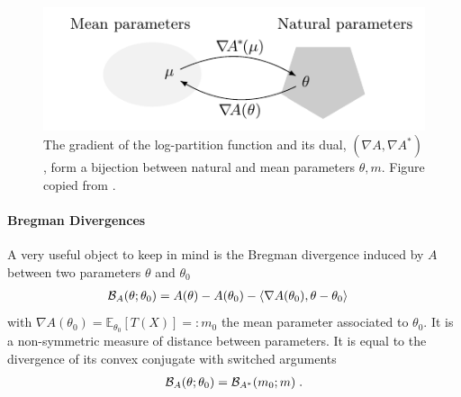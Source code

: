 \documentclass[twoside]{article}
\newcommand*{\expect}[2][]{\ensuremath{\mathbb{E}_{#1} \left[ #2 \right] }} %
\newcommand{\logpart}{A}
\newcommand{\conj}{\logpart^*}
\newcommand{\bregman}{\cB_\logpart}
\newcommand{\bregmanconj}{\cB_{\logpart^*}}
\newcommand{\nat}{\theta}
\newcommand{\m}{m}
\newcommand{\meanp}{\m}
\begin{document}
\begin{figure}[ht]
	\centering
	\includegraphics{duality}
	\caption{The gradient of the log-partition function and its dual, $(\nabla \logpart, \nabla \conj)$, form a bijection between natural and mean parameters $\nat, \meanp$. Figure copied from \citet{kunstner2020homeomorphic}. %
	}
	\label{fig:duality}
\end{figure}

\paragraph{Bregman Divergences}
A very useful object to keep in mind is the Bregman divergence induced by $\logpart$ between two parameters $\nat$ and $\nat_0$
\begin{align}
    \bregman (\nat ; \nat_0)
    & = \logpart(\nat) - \logpart(\nat_0) 
    - \langle \nabla \logpart(\nat_0)  , \nat - \nat_0 \rangle
\end{align}
with $\nabla \logpart(\nat_0) = \expect[\nat_0]{T(X)} =: \meanp_0$ the mean parameter associated to $\nat_0$. 
It is a non-symmetric measure of distance between parameters.
It is equal to the divergence of its convex conjugate with switched arguments
\begin{align}
	\bregman (\nat ; \nat_0)
    = \bregmanconj ( \meanp_0 ; \meanp) \; .
\end{align}
\end{document}
